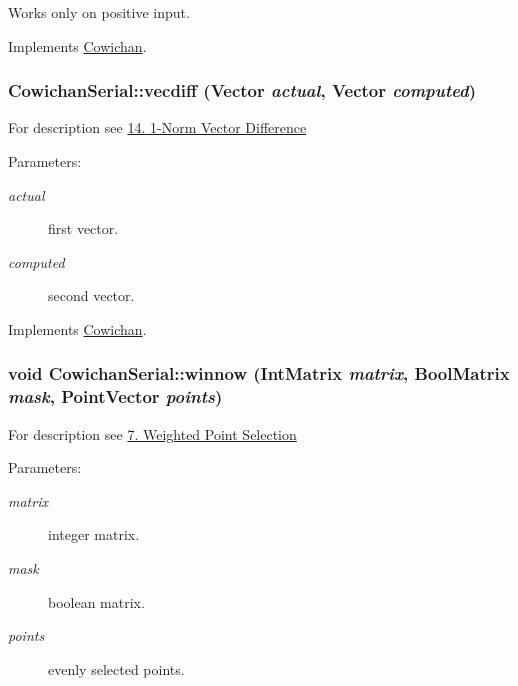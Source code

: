 Works only on positive input. 

Implements \hyperlink{class_cowichan_a0b633b8c1f21884e0998a9c7020c08c}{Cowichan}.\hypertarget{class_cowichan_serial_34b75a2084051b3677071bb3c334d1f4}{
\subsubsection[{vecdiff}]{ CowichanSerial::vecdiff ({\bf Vector} {\em actual}, \/  {\bf Vector} {\em computed})}}
\label{class_cowichan_serial_34b75a2084051b3677071bb3c334d1f4}


For description see \hyperlink{index_vecdiff_sec}{14. 1-Norm Vector Difference} \begin{Desc}
\item[Parameters:]
\begin{description}
\item[{\em actual}]first vector. \item[{\em computed}]second vector. \end{description}
\end{Desc}


Implements \hyperlink{class_cowichan_775d72b5e7d122f9f32555352278250e}{Cowichan}.\hypertarget{class_cowichan_serial_33daca65431f792c2f4f0e7f8d29fa01}{
\subsubsection[{winnow}]{\setlength{\rightskip}{0pt plus 5cm}void CowichanSerial::winnow ({\bf IntMatrix} {\em matrix}, \/  {\bf BoolMatrix} {\em mask}, \/  {\bf PointVector} {\em points})}}
\label{class_cowichan_serial_33daca65431f792c2f4f0e7f8d29fa01}


For description see \hyperlink{index_winnow_sec}{7. Weighted Point Selection} \begin{Desc}
\item[Parameters:]
\begin{description}
\item[{\em matrix}]integer matrix. \item[{\em mask}]boolean matrix. \item[{\em points}]evenly selected points. \end{description}
\end{Desc}


